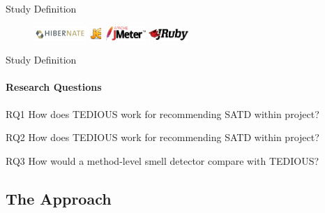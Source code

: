 \documentclass{beamer}
\begin{document}
\begin{darkframes}
\begin{frame}{Study Definition}
    				\begin{figure}[t]
    					\centering
    					\includegraphics[width=20mm]{resources/Hibernate}
    					\hspace{10mm}
    					\includegraphics[width=5mm]{resources/jEdit}
    					\hspace{10mm} 
    					\includegraphics[width=15mm]{resources/jMeter}
    					\hspace{10mm} 
    					\includegraphics[width=15mm]{resources/jRuby}
    				\end{figure}
    			\end{frame}
    		
    			\begin{frame}{Study Definition}
    				\framesubtitle{Research Questions}
    				\centering
    				\begin{block}{RQ1}
    					How does TEDIOUS work for recommending SATD within project?
    				\end{block}
	    			\begin{block}{RQ2}
	    				How does TEDIOUS work for recommending SATD within project?
	    			\end{block}
		    		\begin{block}{RQ3}
		    			How would a method-level smell detector compare with TEDIOUS?
		    		\end{block}
    			\end{frame}
	    	

		    
		    \subsection{The Approach}
		 

\end{darkframes}
\end{document}
